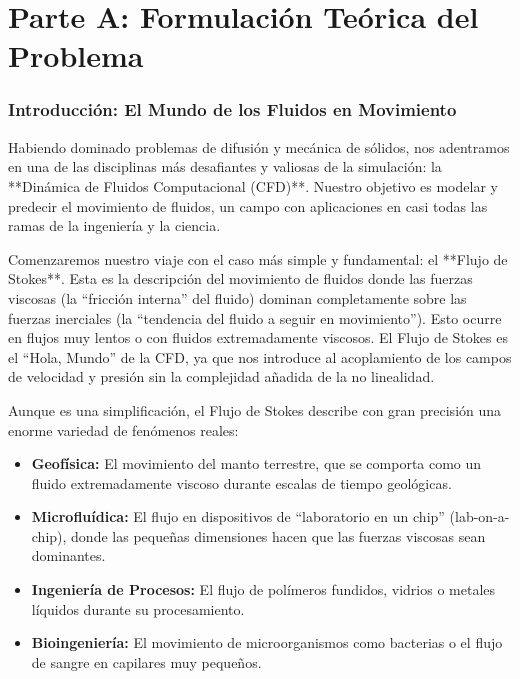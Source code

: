 \part*{Parte A: Formulación Teórica del Problema}

\section{Introducción: El Mundo de los Fluidos en Movimiento}
Habiendo dominado problemas de difusión y mecánica de sólidos, nos adentramos en una de las disciplinas más desafiantes y valiosas de la simulación: la **Dinámica de Fluidos Computacional (CFD)**. Nuestro objetivo es modelar y predecir el movimiento de fluidos, un campo con aplicaciones en casi todas las ramas de la ingeniería y la ciencia.

Comenzaremos nuestro viaje con el caso más simple y fundamental: el **Flujo de Stokes**. Esta es la descripción del movimiento de fluidos donde las fuerzas viscosas (la ``fricción interna'' del fluido) dominan completamente sobre las fuerzas inerciales (la ``tendencia del fluido a seguir en movimiento''). Esto ocurre en flujos muy lentos o con fluidos extremadamente viscosos. El Flujo de Stokes es el ``Hola, Mundo'' de la CFD, ya que nos introduce al acoplamiento de los campos de velocidad y presión sin la complejidad añadida de la no linealidad.

\begin{infobox}
    Aunque es una simplificación, el Flujo de Stokes describe con gran precisión una enorme variedad de fenómenos reales:
    \begin{itemize}
        \item \textbf{Geofísica:} El movimiento del manto terrestre, que se comporta como un fluido extremadamente viscoso durante escalas de tiempo geológicas.
        \item \textbf{Microfluídica:} El flujo en dispositivos de ``laboratorio en un chip'' (lab-on-a-chip), donde las pequeñas dimensiones hacen que las fuerzas viscosas sean dominantes.
        \item \textbf{Ingeniería de Procesos:} El flujo de polímeros fundidos, vidrios o metales líquidos durante su procesamiento.
        \item \textbf{Bioingeniería:} El movimiento de microorganismos como bacterias o el flujo de sangre en capilares muy pequeños.
    \end{itemize}
\end{infobox}

